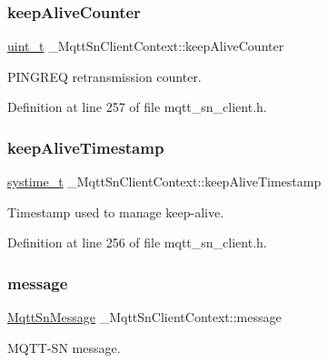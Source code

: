 \subsubsection{\texorpdfstring{keep\+Alive\+Counter}{keepAliveCounter}}
{\footnotesize\ttfamily \hyperlink{compiler__port_8h_a12a1e9b3ce141648783a82445d02b58d}{uint\+\_\+t} \+\_\+\+Mqtt\+Sn\+Client\+Context\+::keep\+Alive\+Counter}



P\+I\+N\+G\+R\+EQ retransmission counter. 



Definition at line 257 of file mqtt\+\_\+sn\+\_\+client.\+h.

\mbox{\label{struct__MqttSnClientContext_a73e5a2ca2b8df9086fe4e0be2f1ce8a4}} 
\subsubsection{\texorpdfstring{keep\+Alive\+Timestamp}{keepAliveTimestamp}}
{\footnotesize\ttfamily \hyperlink{compiler__port_8h_ae3e32a98d431a02106616da3071832dd}{systime\+\_\+t} \+\_\+\+Mqtt\+Sn\+Client\+Context\+::keep\+Alive\+Timestamp}



Timestamp used to manage keep-\/alive. 



Definition at line 256 of file mqtt\+\_\+sn\+\_\+client.\+h.

\mbox{\label{struct__MqttSnClientContext_ac46ef511cd60fd0f70caf1c5c0357c90}} 
\subsubsection{\texorpdfstring{message}{message}}
{\footnotesize\ttfamily \hyperlink{structMqttSnMessage}{Mqtt\+Sn\+Message} \+\_\+\+Mqtt\+Sn\+Client\+Context\+::message}



M\+Q\+T\+T-\/\+SN message. 



